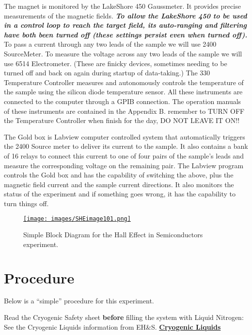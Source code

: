 \documentclass{../lab}
\begin{document}
The magnet is monitored by the LakeShore 450 Gaussmeter. It provides precise measurements of the magnetic fields. \emph{\textbf{To allow the LakeShore 450 to be used in a control loop to reach the target field, its auto-ranging and filtering have both been turned off (these settings persist even when turned off).}} To pass a current through any two leads of the sample we will use 2400 SourceMeter. To measure the voltage across any two leads of the sample we will use 6514 Electrometer. (These are finicky devices, sometimes needing to be turned off and back on again during startup of data-taking.) The 330 Temperature Controller measures and autonomously controls the temperature of the sample using the silicon diode temperature sensor. All these instruments are connected to the computer through a GPIB connection. The operation manuals of these instruments are contained in the Appendix B. {remember to TURN OFF the Temperature Controller when finish for the day, DO NOT LEAVE IT ON!!}

The Gold box is Labview computer controlled system that automatically triggers the 2400 Source meter to deliver its current to the sample. It also contains a bank of 16 relays to connect this current to one of four pairs of the sample's leads and measure the corresponding voltage on the remaining pair. The Labview program controls the Gold box and has the capability of switching the above, plus the magnetic field current and the sample current directions. It also monitors the status of the experiment and if something goes wrong, it has the capability to turn things off.


\begin{figure}[h]
    \centering
    \href{http://experimentationlab.berkeley.edu/sites/default/files/images/SHEimage101.gif}{\texttt{[image: images/SHEimage101.png]}}
    \caption{Simple Block Diagram for the Hall Effect in Semiconductors experiment.}
    \label{fig:SimpleBlockDiagram}
\end{figure}

\section{Procedure}

Below is a ``simple'' procedure for this experiment.

Read the Cryogenic Safety sheet \textbf{before} filling the system with Liquid Nitrogen: See the Cryogenic Liquids information from EH\&S. \href{http://experimentationlab.berkeley.edu/sites/default/files/images/77cryogenic.pdf}{\textbf{Cryogenic Liquids}}
\end{document}

